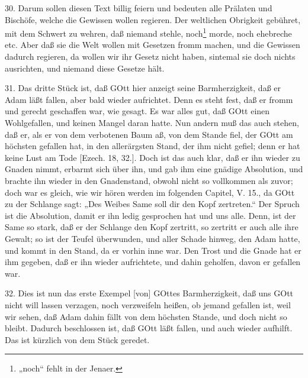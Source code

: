 30. Darum sollen diesen Text billig feiern und bedeuten alle Prälaten und Bischöfe, welche die Gewissen wollen regieren. Der weltlichen Obrigkeit gebühret, mit dem Schwert zu wehren, daß niemand stehle, noch\footnote{„noch“ fehlt in der Jenaer.} morde, noch ehebreche etc. Aber daß sie die Welt wollen mit Gesetzen fromm machen, und die Gewissen dadurch regieren, da wollen wir ihr Gesetz nicht haben, sintemal sie doch nichts ausrichten, und niemand diese Gesetze hält.

31. Das dritte Stück ist, daß GOtt hier anzeigt seine Barmherzigkeit, daß er Adam läßt fallen, aber bald wieder aufrichtet. Denn es steht fest, daß er fromm und gerecht geschaffen war, wie gesagt. Es war alles gut, daß GOtt einen Wohlgefallen, und keinen Mangel daran hatte. Nun andern muß das auch stehen, daß er, als er von dem verbotenen Baum aß, von dem Stande fiel, der GOtt am höchsten gefallen hat, in den allerärgsten Stand, der ihm nicht gefiel; denn er hat keine Lust am Tode [Ezech. 18, 32.]. Doch ist das auch klar, daß er ihn wieder zu Gnaden nimmt, erbarmt sich über ihn, und gab ihm eine gnädige Absolution, und brachte ihn wieder in den Gnadenstand, obwohl nicht so vollkommen als zuvor; doch war es
gleich, wie wir hören werden im folgenden Capitel, V. 15., da GOtt zu der Schlange sagt: „Des Weibes Same soll dir den Kopf zertreten.“ Der Spruch ist die Absolution, damit er ihn ledig gesprochen hat und uns alle. Denn, ist der Same so stark, daß er der Schlange den Kopf zertritt, so zertritt er auch alle ihre Gewalt; so ist der Teufel überwunden, und aller Schade hinweg, den Adam hatte, und kommt in den Stand, da er vorhin inne war. Den Trost und die Gnade hat er ihm gegeben, daß er ihn wieder aufrichtete, und dahin geholfen, davon er gefallen war.

32. Dies ist nun das erste Exempel [von] GOttes Barmherzigkeit, daß uns GOtt nicht will lassen verzagen, noch verzweifeln heißen, ob jemand gefallen ist, weil wir sehen, daß Adam dahin fällt von dem höchsten Stande, und doch nicht so bleibt. Dadurch beschlossen ist, daß GOtt läßt fallen, und auch wieder aufhilft. Das ist kürzlich von dem Stück geredet.

